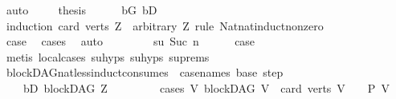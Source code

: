 \begin{isabellebody}
\ auto\ \isanewline
\ \ \isamarkupfalse%
\ {\isachardoublequoteopen}{\isacharquery}{\kern0pt}thesis{\isachardoublequoteclose}\isanewline
\ \ \ \ \isamarkupfalse%
\ bG\ bD\isanewline
\ \ \isamarkupfalse%
\ {\isacharparenleft}{\kern0pt}induction\ {\isachardoublequoteopen}card\ {\isacharparenleft}{\kern0pt}verts\ Z{\isacharparenright}{\kern0pt}{\isachardoublequoteclose}\ \ arbitrary{\isacharcolon}{\kern0pt}\ Z\ rule{\isacharcolon}{\kern0pt}\ Nat{\isachardot}{\kern0pt}nat{\isacharunderscore}{\kern0pt}induct{\isacharunderscore}{\kern0pt}non{\isacharunderscore}{\kern0pt}zero{\isacharparenright}{\kern0pt}\isanewline
\ \ \ \ \isamarkupfalse%
\ {}\isanewline
\ \ \ \ \isamarkupfalse%
\ \isamarkupfalse%
\ {\isacharquery}{\kern0pt}case\ \isamarkupfalse%
\ cases{\isacharparenleft}{\kern0pt}{}{\isacharparenright}{\kern0pt}\ \isamarkupfalse%
\ auto\isanewline
\ \ \isamarkupfalse%
\isanewline
\ \ \ \ \isamarkupfalse%
\ su{\isacharcolon}{\kern0pt}\ {\isacharparenleft}{\kern0pt}Suc\ n{\isacharparenright}{\kern0pt}\isanewline
\ \ \ \ \isamarkupfalse%
\ {\isacharquery}{\kern0pt}case\ \isanewline
\ \ \ \ \ \ \isamarkupfalse%
\ {\isacharparenleft}{\kern0pt}metis\ local{\isachardot}{\kern0pt}cases{\isacharparenleft}{\kern0pt}{}{\isacharparenright}{\kern0pt}\ su{\isachardot}{\kern0pt}hyps{\isacharparenleft}{\kern0pt}{}{\isacharparenright}{\kern0pt}\ su{\isachardot}{\kern0pt}hyps{\isacharparenleft}{\kern0pt}{}{\isacharparenright}{\kern0pt}\ su{\isachardot}{\kern0pt}prems{\isacharparenright}{\kern0pt}\ \ \ \isanewline
\ \ \isamarkupfalse%
\ \ \ \isanewline
{}\isamarkupfalse%
%
\endisatagproof
{\isafoldproof}%
%
\isadelimproof
\ \isanewline
%
\endisadelimproof
\isanewline
\isanewline
{}\isamarkupfalse%
\ blockDAG{\isacharunderscore}{\kern0pt}nat{\isacharunderscore}{\kern0pt}less{\isacharunderscore}{\kern0pt}induct{\isacharbrackleft}{\kern0pt}consumes\ {}{\isacharcomma}{\kern0pt}\ case{\isacharunderscore}{\kern0pt}names\ base\ step{\isacharbrackright}{\kern0pt}{\isacharcolon}{\kern0pt}\ \isanewline
\ \ \isanewline
\ \ \ \ bD{\isacharcolon}{\kern0pt}\ {\isachardoublequoteopen}blockDAG\ Z{\isachardoublequoteclose}\isanewline
\ \ \ \ \isanewline
\ \ \ \ cases{\isacharcolon}{\kern0pt}\ {\isachardoublequoteopen}{\isasymAnd}V{\isachardot}{\kern0pt}\ {\isacharparenleft}{\kern0pt}blockDAG\ V\ {\isasymLongrightarrow}\ card\ {\isacharparenleft}{\kern0pt}verts\ V{\isacharparenright}{\kern0pt}\ {\isacharequal}{\kern0pt}\ {}\ {\isasymLongrightarrow}\ P\ V{\isacharparenright}{\kern0pt}{\isachardoublequoteclose}\isanewline

\end{isabellebody}
